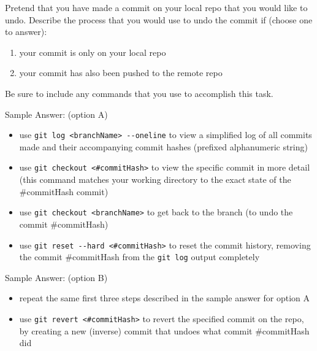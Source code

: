 \documentclass[12pt,fleqn]{examtst}
\begin{document}

\newpage
\noindent
\begin{minipage}{\textwidth}

 Pretend that you have made a commit on your local repo that you would like to undo. Describe the process that you would use to undo the commit if (choose one to answer):

\begin{enumerate}
    \item your commit is only on your local repo
    \item your commit has also been pushed to the remote repo
\end{enumerate}

Be sure to include any commands that you use to accomplish this task.


Sample Answer: (option A)
\begin{itemize}
    \item use \lstinline{git log <branchName> --oneline} to view a simplified log of all commits made and their accompanying commit hashes (prefixed alphanumeric string)
    \item use \lstinline{git checkout <#commitHash>} to view the specific commit in more detail (this command matches your working directory to the exact state of the \#commitHash commit)
    \item use \lstinline{git checkout <branchName>} to get back to the branch (to undo the commit \#commitHash)
    \item use \lstinline{git reset --hard <#commitHash>} to reset the commit history, removing the commit \#commitHash from the \lstinline{git log} output completely
\end{itemize}

\rule{0cm}{1cm}

Sample Answer: (option B)
\begin{itemize}
    \item repeat the same first three steps described in the sample answer for option A
    \item use \lstinline{git revert <#commitHash>} to revert the specified commit on the repo, by creating a new (inverse) commit that undoes what commit \#commitHash did
\end{itemize}

\end{minipage}
\end{document}

